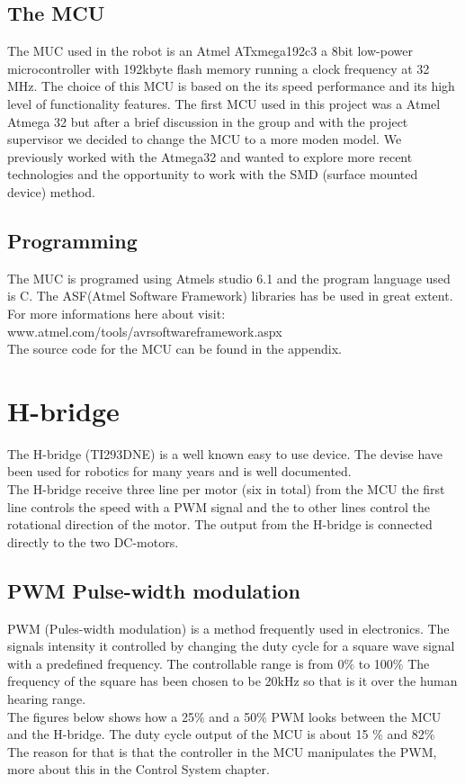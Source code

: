 \subsection{The MCU}
The MUC used in the robot is an Atmel ATxmega192c3 a 8bit low-power microcontroller with 192kbyte flash memory running a clock frequency at 32 MHz. The choice of this MCU is based on the its speed performance and its high level of functionality features. The first MCU used in this project was a Atmel Atmega 32 but after a brief discussion in the group and with the project supervisor we decided to change the MCU to a more moden model. We previously worked with the Atmega32 and wanted to explore more recent technologies and the opportunity to work with the SMD (surface mounted device) method. 

\subsection{Programming}
The MUC is programed using Atmels studio 6.1 and the program language used is C. The ASF(Atmel Software Framework) libraries has be used in great extent. For more informations here about visit:\\  www.atmel.com/tools/avrsoftwareframework.aspx \\
The source code for the MCU can be found in the appendix. 

\section{H-bridge}
The H-bridge (TI293DNE) is a well known easy to use device. The devise have been used for robotics for many years and is well documented. \\  
The H-bridge receive three line per motor (six in total) from the MCU the first line controls the speed with a PWM signal and the to other lines control the rotational direction of the motor. The output from the H-bridge is connected directly to the two DC-motors.


\newpage

\subsection{PWM Pulse-width modulation}

PWM (Pules-width modulation) is a method frequently used in electronics. The signals intensity it controlled by changing the duty cycle for a square wave signal with a predefined frequency. The controllable range is from 0$\% $ to 100$\%$ 
The frequency of the square has been chosen to be 20kHz so that is it over the human hearing range. 
\\
The figures below shows how a 25$\%$ and a 50$\%$  PWM looks between the MCU and the H-bridge. The duty cycle output of the MCU is about 15 $\%$ and 82$\%$ The reason for that is that the controller in the MCU manipulates the PWM, more about this in the Control System chapter.

